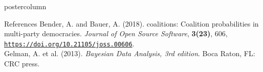 \documentclass[final,hyperref={pdfpagelabels=false}]{beamer}
\begin{document}
\begin{frame}
\begin{columns}
\begin{column}{1\textwidth}
\begin{columns}[T]
\begin{column}{.016\textwidth}
\end{column}

\end{columns}


\vspace{2ex}
\begin{beamercolorbox}[center,wd=\textwidth]{postercolumn}
\begin{minipage}[T]{.95\textwidth}  %
\begin{block}{\footnotesize References}
{\footnotesize
Bender, A. and Bauer, A. (2018). coalitions: Coalition probabilities in multi-party democracies.
\textit{Journal of Open Source Software}, \textbf{3(23)}, 606,
\href{https://doi.org/10.21105/joss.00606}{\texttt{https://doi.org/10.21105/joss.00606}}. \\
Gelman, A. et al. (2013). \textit{Bayesian Data Analysis, 3rd edition}. Boca Raton, FL: CRC press.
}
\end{block}
\end{minipage}
\end{beamercolorbox}

\end{column} %
\end{columns}
\end{frame}
\end{document}
